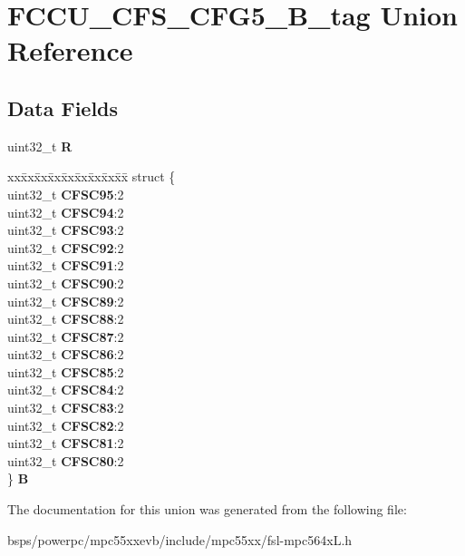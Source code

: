 \hypertarget{unionFCCU__CFS__CFG5__32B__tag}{}\section{F\+C\+C\+U\+\_\+\+C\+F\+S\+\_\+\+C\+F\+G5\+\_\+B\+\_\+tag Union Reference}
\label{unionFCCU__CFS__CFG5__32B__tag}
\subsection*{Data Fields}
\begin{DoxyCompactItemize}
\item 
\mbox{\label{unionFCCU__CFS__CFG5__32B__tag_a4bdf1762859c7c8c7ae175ec0c8f42f6}} 
uint32\+\_\+t {\bfseries R}
\item 
\mbox{\label{unionFCCU__CFS__CFG5__32B__tag_a5941e9fa3aba2fbfff53fb358d94def6}} 
\begin{tabbing}
xx\=xx\=xx\=xx\=xx\=xx\=xx\=xx\=xx\=\kill
struct \{\\
\>uint32\_t {\bfseries CFSC95}:2\\
\>uint32\_t {\bfseries CFSC94}:2\\
\>uint32\_t {\bfseries CFSC93}:2\\
\>uint32\_t {\bfseries CFSC92}:2\\
\>uint32\_t {\bfseries CFSC91}:2\\
\>uint32\_t {\bfseries CFSC90}:2\\
\>uint32\_t {\bfseries CFSC89}:2\\
\>uint32\_t {\bfseries CFSC88}:2\\
\>uint32\_t {\bfseries CFSC87}:2\\
\>uint32\_t {\bfseries CFSC86}:2\\
\>uint32\_t {\bfseries CFSC85}:2\\
\>uint32\_t {\bfseries CFSC84}:2\\
\>uint32\_t {\bfseries CFSC83}:2\\
\>uint32\_t {\bfseries CFSC82}:2\\
\>uint32\_t {\bfseries CFSC81}:2\\
\>uint32\_t {\bfseries CFSC80}:2\\
\} {\bfseries B}\\

\end{tabbing}\end{DoxyCompactItemize}


The documentation for this union was generated from the following file\+:\begin{DoxyCompactItemize}
\item 
bsps/powerpc/mpc55xxevb/include/mpc55xx/fsl-\/mpc564x\+L.\+h\end{DoxyCompactItemize}
